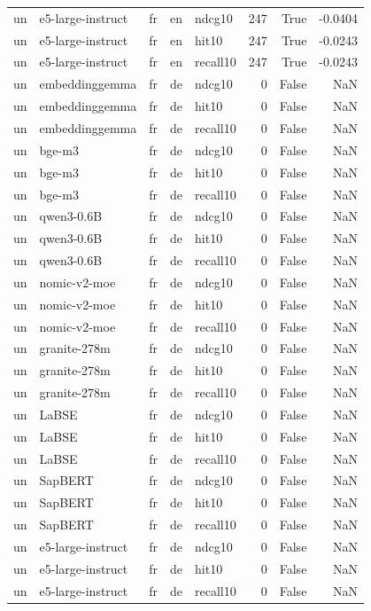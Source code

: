 \begin{tabular}{lllllrrr}
un & e5-large-instruct & fr & en & ndcg10 & 247 & True & -0.0404 \\
un & e5-large-instruct & fr & en & hit10 & 247 & True & -0.0243 \\
un & e5-large-instruct & fr & en & recall10 & 247 & True & -0.0243 \\
un & embeddinggemma & fr & de & ndcg10 & 0 & False & NaN \\
un & embeddinggemma & fr & de & hit10 & 0 & False & NaN \\
un & embeddinggemma & fr & de & recall10 & 0 & False & NaN \\
un & bge-m3 & fr & de & ndcg10 & 0 & False & NaN \\
un & bge-m3 & fr & de & hit10 & 0 & False & NaN \\
un & bge-m3 & fr & de & recall10 & 0 & False & NaN \\
un & qwen3-0.6B & fr & de & ndcg10 & 0 & False & NaN \\
un & qwen3-0.6B & fr & de & hit10 & 0 & False & NaN \\
un & qwen3-0.6B & fr & de & recall10 & 0 & False & NaN \\
un & nomic-v2-moe & fr & de & ndcg10 & 0 & False & NaN \\
un & nomic-v2-moe & fr & de & hit10 & 0 & False & NaN \\
un & nomic-v2-moe & fr & de & recall10 & 0 & False & NaN \\
un & granite-278m & fr & de & ndcg10 & 0 & False & NaN \\
un & granite-278m & fr & de & hit10 & 0 & False & NaN \\
un & granite-278m & fr & de & recall10 & 0 & False & NaN \\
un & LaBSE & fr & de & ndcg10 & 0 & False & NaN \\
un & LaBSE & fr & de & hit10 & 0 & False & NaN \\
un & LaBSE & fr & de & recall10 & 0 & False & NaN \\
un & SapBERT & fr & de & ndcg10 & 0 & False & NaN \\
un & SapBERT & fr & de & hit10 & 0 & False & NaN \\
un & SapBERT & fr & de & recall10 & 0 & False & NaN \\
un & e5-large-instruct & fr & de & ndcg10 & 0 & False & NaN \\
un & e5-large-instruct & fr & de & hit10 & 0 & False & NaN \\
un & e5-large-instruct & fr & de & recall10 & 0 & False & NaN \\

\end{tabular}
